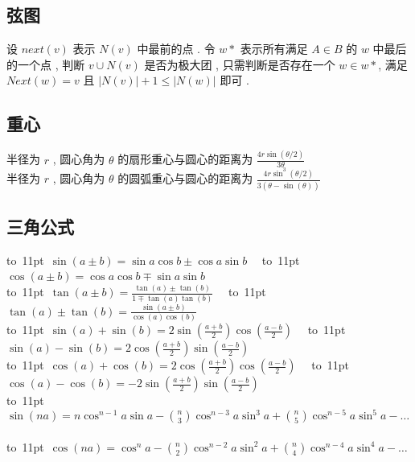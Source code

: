 \subsection{弦图}
设 $next(v)$ 表示 $N(v)$ 中最前的点 .
令 $w*$ 表示所有满足 $A \in B$ 的 $w$ 中最后的一个点 ,
判断 $v \cup N(v)$ 是否为极大团 ,
只需判断是否存在一个 $w \in w*$,
满足 $Next(w)=v$ 且 $|N(v)| + 1 \leq |N(w)|$ 即可 .
\subsection{重心}
半径为 $r$ , 圆心角为 $\theta$ 的扇形重心与圆心的距离为 $\frac{4r\sin(\theta/2)}{3\theta}$ \\
半径为 $r$ , 圆心角为 $\theta$ 的圆弧重心与圆心的距离为 $\frac{4r\sin^3(\theta/2)}{3(\theta-\sin(\theta))}$ \\
\subsection{三角公式}
\begin{footnotesize}
\noindent
\mbox{\vbox to 11pt{  \hbox{$
\sin(a \pm b) = \sin a \cos b \pm \cos a \sin b
$}  }}
\
\mbox{\vbox to 11pt{  \hbox{$
\cos(a \pm b) = \cos a \cos b \mp \sin a \sin b
$}  }}
\\
\mbox{\vbox to 11pt{  \hbox{$
\tan(a \pm b) = \frac{\tan(a)\pm\tan(b)}{1 \mp \tan(a)\tan(b)}
$}  }}
\
\mbox{\vbox to 11pt{  \hbox{$
\tan(a) \pm \tan(b) = \frac{\sin(a \pm b)}{\cos(a)\cos(b)}
$}  }}
\\
\mbox{\vbox to 11pt{  \hbox{$
\sin(a) + \sin(b) = 2\sin(\frac{a + b}{2})\cos(\frac{a - b}{2})
$}  }}
\
\mbox{\vbox to 11pt{  \hbox{$
\sin(a) - \sin(b) = 2\cos(\frac{a + b}{2})\sin(\frac{a - b}{2})
$}  }}
\\
\mbox{\vbox to 11pt{  \hbox{$
\cos(a) + \cos(b) = 2\cos(\frac{a + b}{2})\cos(\frac{a - b}{2})
$}  }}
\
\mbox{\vbox to 11pt{  \hbox{$
\cos(a) - \cos(b) = -2\sin(\frac{a + b}{2})\sin(\frac{a - b}{2})
$}  }}
\\
\mbox{\vbox to 11pt{  \hbox{$
\sin(na) = n\cos^{n-1}a\sin a - \binom{n}{3}\cos^{n-3}a \sin^3a + \binom{n}{5}\cos^{n-5}a\sin^5a - \dots
$}  }}
\\
\mbox{\vbox to 11pt{  \hbox{$
\cos(na) = \cos^{n}a - \binom{n}{2}\cos^{n-2}a \sin^2a + \binom{n}{4}\cos^{n-4}a\sin^4a - \dots
$}  }}
\end{footnotesize}
